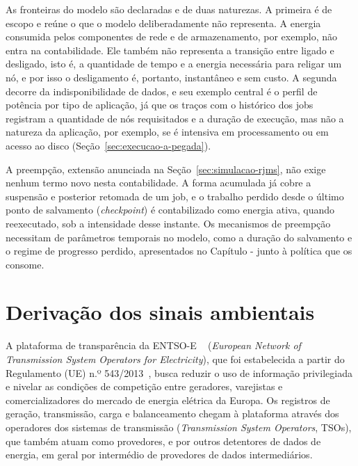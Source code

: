As fronteiras do modelo são declaradas e de duas naturezas. A primeira é de escopo e reúne o que o modelo
deliberadamente não representa. A energia consumida pelos componentes de rede e de armazenamento, por exemplo,
não entra na contabilidade. Ele também não representa a transição entre ligado e desligado,
isto é, a quantidade de tempo e a energia necessária para religar um nó, e por isso o desligamento
é, portanto, instantâneo e sem custo. A segunda decorre da indisponibilidade
de dados, e seu exemplo central é o perfil de potência por tipo de aplicação, já que 
os traços com o histórico dos jobs registram a quantidade de nós requisitados e a duração
de execução, mas não a natureza da aplicação, por exemplo, se é intensiva em processamento ou em 
acesso ao disco (Seção~\ref{sec:execucao-a-pegada}).

A preempção, extensão anunciada na Seção~\ref{sec:simulacao-rjms}, não exige nenhum termo novo nesta 
contabilidade. A forma acumulada já cobre a suspensão e posterior retomada de um job, 
e o trabalho perdido desde o último ponto de salvamento (\textit{checkpoint}) é contabilizado como energia ativa,
quando reexecutado, sob a intensidade desse instante. Os mecanismos de preempção necessitam de parâmetros
temporais no modelo, como a duração do salvamento e o regime de progresso perdido, apresentados no Capítulo -
junto à política que os consome.


\section{Derivação dos sinais ambientais}
\label{sec:derivacao-sinais}

A plataforma de transparência da ENTSO-E ~\citep{entsoe-platform} (\textit{European Network of
Transmission System Operators for Electricity}), que foi estabelecida a partir do
Regulamento (UE) n.º 543/2013~\citep{eu-regulation-543-2013}, busca reduzir o uso de informação privilegiada
e nivelar as condições de competição entre geradores, varejistas e comercializadores do 
mercado de energia elétrica da Europa. Os registros de geração, transmissão, carga e balanceamento
chegam à plataforma através dos operadores dos sistemas de transmissão (\textit{Transmission 
System Operators}, TSOs), que também atuam como provedores, e por outros detentores de dados de energia, em geral 
por intermédio de provedores de dados intermediários. 

